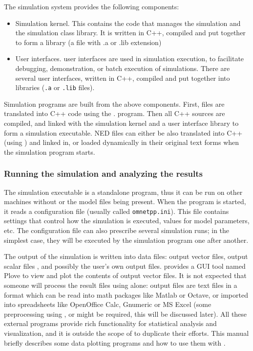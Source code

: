 The simulation system provides the following components:
\begin{itemize}
  \item{Simulation kernel. This contains the
    code that manages the simulation and the simulation class library.
    It is written in C++, compiled and put together to form a library
    (a file with .a or .lib extension)}
  \item{User interfaces.
     {\opp} user interfaces
    are used in simulation execution, to facilitate debugging,
    demonstration, or batch execution of simulations. There are
    several user interfaces, written in C++, compiled and put together
    into libraries (\texttt{.a} or \texttt{.lib} files).}
\end{itemize}


Simulation programs are built from the above components. First,
 files are translated into C++ code using the .
program. Then all C++ sources are compiled, and linked with the simulation
kernel and a user interface library to form a simulation executable.
NED files can either be also translated into C++
(using ) and linked in, or loaded dynamically in their original
text forms when the simulation program starts.



\subsubsection{Running the simulation and analyzing the results}

The simulation executable is a standalone program,
thus it can be run on other machines without {\opp} or the model files
being present. When the program is started, it reads a configuration
file (usually called
\texttt{omnetpp.ini}). This file contains settings that
control how the simulation is executed, values for model parameters, etc.
The configuration file can also prescribe several simulation runs; in
the simplest case, they will be executed by the simulation program one
after another.

The output of the simulation is written into data files: output vector
files, output scalar files
, and possibly the user's own output files.
{\opp} provides a GUI tool named Plove to view and plot the contents
of output vector files. It is not expected that someone will
process the result files using {\opp} alone: output files are text
files in a format which can be read into math packages like Matlab
or Octave, or imported into spreadsheets like OpenOffice Calc,
Gnumeric or MS Excel (some preprocessing using , 
or  might be required, this will be discussed later).
All these external programs provide rich functionality for statistical
analysis and visualization, and it is outside the scope of {\opp} to
duplicate their efforts. This manual briefly describes
some data plotting programs and how to use them with {\opp}.

